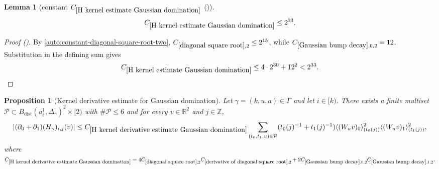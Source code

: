 \documentclass[12pt,reqno]{amsart}
\newcommand{\auto}{{({\tiny\faCar})}}
\theoremstyle{plain}
\newtheorem{lemma}[theorem]{Lemma}
\newtheorem{proposition}[theorem]{Proposition}
\numberwithin{equation}{section}
\theoremstyle{remark}
\newcommand{\using}[1]{}
\newcommand{\Z}{{\mathbb Z}}
\newcommand{\R}{{\mathbb R}}
\begin{document}
\begin{lemma}[constant $C_{\ref{H kernel estimate Gaussian domination}}$ \auto]\label{constant H kernel estimate Gaussian domination}\using{constant diagonal square root}\using{diagonal square root}\using{Gaussian bump decay}\using{H kernel estimate Gaussian domination}
\begin{equation}\label{constant H kernel estimate Gaussian domination bound}
C_{\ref{H kernel estimate Gaussian domination}}\le2^{33}.
\end{equation}
\end{lemma}
\begin{proof}[Proof \auto]
By \eqref{auto:constant-diagonal-square-root-two},
$C_{\ref{diagonal square root},2}\le2^{15}$, while
$C_{\ref{Gaussian bump decay},0,2}=12$. Substitution in the defining sum gives
\[
C_{\ref{H kernel estimate Gaussian domination}}
\le4\cdot2^{30}+12^2<2^{33}.
\]
\end{proof}


\begin{proposition}[Kernel derivative estimate for Gaussian domination]\label{H kernel derivative estimate Gaussian domination}\using{H kernel estimate Gaussian domination}\using{diagonal square root}\using{derivative of diagonal square root}\using{Gaussian bump decay}
Let $\gamma=(k,u,a)\in \Gamma$ and let $i\in [k)$.
There exists a finite multiset $\mathcal{P}\subset B_{\mathrm{dist}}(a_i^1,\Delta_\gamma)^2\times [2)$ with $\#\mathcal{P}\le 6$ and for every $v\in \R^2$ and $j\in\Z$,
    \begin{equation}\label{auto:H-kernel-derivative-Gaussian-domination}|(\partial_0+\partial_1)(H_\gamma)_{i,j}(v)| \le C_{\ref{H kernel derivative estimate Gaussian domination}} \sum_{(t_0,t_1,u)\in\mathcal{P}} (t_0(j)^{-1} + t_1(j)^{-1}) \langle (W_u v)_0\rangle_{(t_0(j))}^2 \langle (W_u v)_1\rangle_{(t_1(j))}^2, \end{equation}
where $
C_{\ref{H kernel derivative estimate Gaussian domination}}
=
4C_{\ref{diagonal square root},2}
C_{\ref{derivative of diagonal square root},2}
+
2C_{\ref{Gaussian bump decay},0,2}
C_{\ref{Gaussian bump decay},1,2}.
$
\end{proposition}
\end{document}

